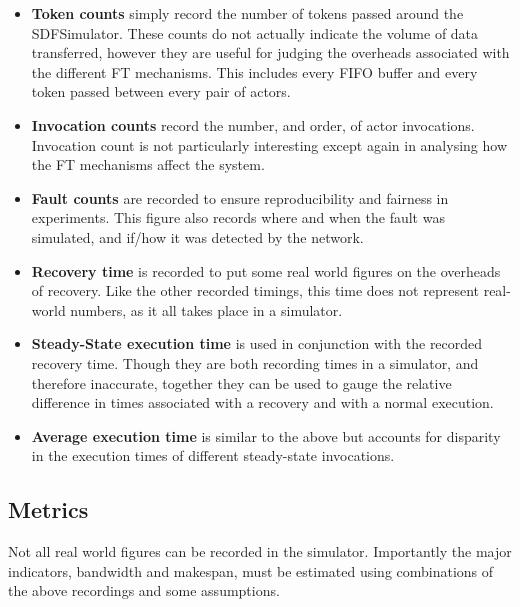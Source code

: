 \begin{itemize}
	\item {\bf Token counts} simply record the number of tokens passed around the SDFSimulator.
			These counts do not actually indicate the volume of data transferred, however they are useful for judging the overheads associated with the different FT mechanisms.
			This includes every FIFO buffer and every token passed between every pair of actors.
	\item {\bf Invocation counts} record the number, and order, of actor invocations.
			Invocation count is not particularly interesting except again in analysing how the FT mechanisms affect the system.
	\item {\bf Fault counts} are recorded to ensure reproducibility and fairness in experiments.
			This figure also records where and when the fault was simulated, and if/how it was detected by the network.
	\item {\bf Recovery time} is recorded to put some real world figures on the overheads of recovery.
			Like the other recorded timings, this time does not represent real-world numbers, as it all takes place in a simulator.
	\item {\bf Steady-State execution time} is used in conjunction with the recorded recovery time.
			Though they are both recording times in a simulator, and therefore inaccurate, together they can be used to gauge the relative difference in times associated with a recovery and with a normal execution.
	\item {\bf Average execution time} is similar to the above but accounts for disparity in the execution times of different steady-state invocations.
\end{itemize}

\subsection{Metrics}
\label{secSystemMetrics}

Not all real world figures can be recorded in the simulator.
Importantly the major indicators, bandwidth and makespan, must be estimated using combinations of the above recordings and some assumptions.

